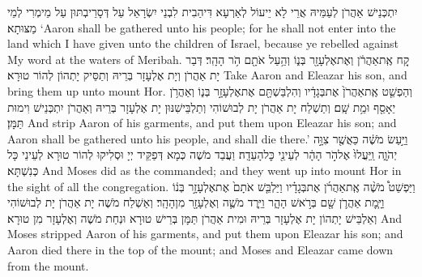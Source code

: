 {יִתְכְּנֵישׁ אַהֲרֹן לְעַמֵּיהּ אֲרֵי לָא יֵיעוֹל לְאַרְעָא דִּיהַבִית לִבְנֵי יִשְׂרָאֵל עַל דְּסָרֵיבְתּוּן עַל מֵימְרִי לְמֵי מַצּוּתָא׃}
{‘Aaron shall be gathered unto his people; for he shall not enter into the land which I have given unto the children of Israel, because ye rebelled against My word at the waters of Meribah.}{}
{קַ֚ח אֶֽת\maqqaf אַהֲרֹ֔ן וְאֶת\maqqaf אֶלְעָזָ֖ר בְּנ֑וֹ וְהַ֥עַל אֹתָ֖ם הֹ֥ר הָהָֽר׃}
{דְּבַר יָת אַהֲרֹן וְיָת אֶלְעָזָר בְּרֵיהּ וְתַסֵּיק יָתְהוֹן לְהוֹר טוּרָא׃}
{Take Aaron and Eleazar his son, and bring them up unto mount Hor.}{}
{וְהַפְשֵׁ֤ט אֶֽת\maqqaf אַהֲרֹן֙ אֶת\maqqaf בְּגָדָ֔יו וְהִלְבַּשְׁתָּ֖ם אֶת\maqqaf אֶלְעָזָ֣ר בְּנ֑וֹ וְאַהֲרֹ֥ן יֵאָסֵ֖ף וּמֵ֥ת שָֽׁם׃}
{וְתַשְׁלַח יָת אַהֲרֹן יָת לְבוּשׁוֹהִי וְתַלְבֵּישִׁנּוּן יָת אֶלְעָזָר בְּרֵיהּ וְאַהֲרֹן יִתְכְּנֵישׁ וִימוּת תַּמָּן׃}
{And strip Aaron of his garments, and put them upon Eleazar his son; and Aaron shall be gathered unto his people, and shall die there.’}{}
{וַיַּ֣עַשׂ מֹשֶׁ֔ה כַּאֲשֶׁ֖ר צִוָּ֣ה יְהֹוָ֑ה וַֽיַּעֲלוּ֙ אֶל\maqqaf הֹ֣ר הָהָ֔ר לְעֵינֵ֖י כׇּל\maqqaf הָעֵדָֽה׃}
{וַעֲבַד מֹשֶׁה כְּמָא דְּפַקֵּיד יְיָ וּסְלִיקוּ לְהוֹר טוּרָא לְעֵינֵי כָּל כְּנִשְׁתָּא׃}
{And Moses did as the \lord\space commanded; and they went up into mount Hor in the sight of all the congregation.}{}
{וַיַּפְשֵׁט֩ מֹשֶׁ֨ה אֶֽת\maqqaf אַהֲרֹ֜ן אֶת\maqqaf בְּגָדָ֗יו וַיַּלְבֵּ֤שׁ אֹתָם֙ אֶת\maqqaf אֶלְעָזָ֣ר בְּנ֔וֹ וַיָּ֧מׇת אַהֲרֹ֛ן שָׁ֖ם בְּרֹ֣אשׁ הָהָ֑ר וַיֵּ֧רֶד מֹשֶׁ֛ה וְאֶלְעָזָ֖ר מִן\maqqaf הָהָֽר׃}
{וְאַשְׁלַח מֹשֶׁה יָת אַהֲרֹן יָת לְבוּשׁוֹהִי וְאַלְבֵּישׁ יָתְהוֹן יָת אֶלְעָזָר בְּרֵיהּ וּמִית אַהֲרֹן תַּמָּן בְּרֵישׁ טוּרָא וּנְחַת מֹשֶׁה וְאֶלְעָזָר מִן טוּרָא׃}
{And Moses stripped Aaron of his garments, and put them upon Eleazar his son; and Aaron died there in the top of the mount; and Moses and Eleazar came down from the mount.}{}

